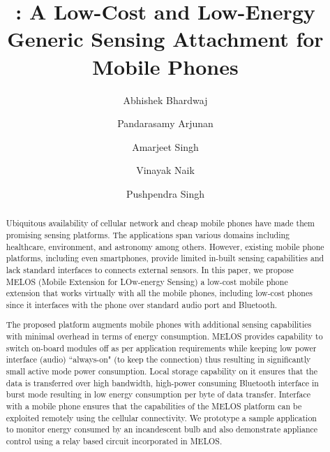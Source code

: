 \documentclass[10pt]{sigplan-proc-varsize}
\author[2]{Abhishek Bhardwaj}
\author[1]{Pandarasamy Arjunan }
\author[1]{Amarjeet Singh }
\author[1]{Vinayak Naik}
\author[1]{Pushpendra Singh}
\affil[1]{Indrapratha Institute of Information Technology, New Delhi, India}
\affil[2]{Netaji Subhash Institute of Technology, New Delhi, India}
\title{\vspace{-5mm} \melosnospace: A Low-Cost and Low-Energy Generic Sensing Attachment for Mobile Phones \vspace{-7mm}}
\newcommand{\melos}{MELOS }
\newcommand{\melosnospace}{MELOS}
\begin{document}
\maketitle


\begin{abstract}
Ubiquitous availability of cellular network and cheap mobile phones have made them promising sensing platforms. The applications span various domains including healthcare, environment, and astronomy among others. However, existing mobile phone platforms, including even smartphones, provide limited in-built sensing capabilities and lack standard interfaces to connects external sensors. In this paper, we propose \melos (Mobile Extension for LOw-energy Sensing) a low-cost mobile phone extension that works virtually with all the mobile phones, including low-cost phones since it interfaces with the phone over standard audio port and Bluetooth. 

The proposed platform augments mobile phones with additional sensing capabilities with minimal overhead in terms of energy consumption. \melos provides capability to switch on-board modules off as per application requirements while keeping low power interface (audio) ``always-on" (to keep the connection) thus resulting in significantly small active mode power consumption. Local storage capability on it ensures that the data is transferred over high bandwidth, high-power consuming Bluetooth interface in burst mode resulting in low energy consumption per byte of data transfer. Interface with a mobile phone ensures that the capabilities of the \melos platform can be exploited remotely using the cellular connectivity. We prototype a sample application to monitor energy consumed by an incandescent bulb and also demonstrate appliance control using a relay based circuit incorporated in \melosnospace. 
\end{abstract}

%
%



\end{document}
